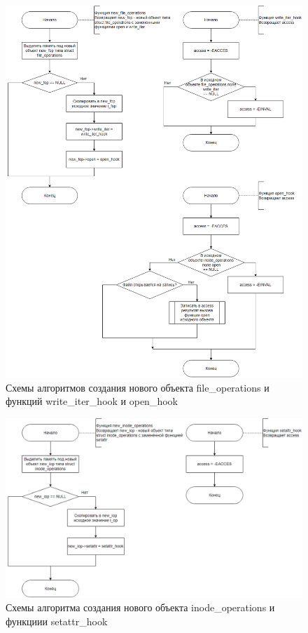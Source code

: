 \begin{figure}[h]
	\centering
	\captionsetup{justification=centering}
	\includegraphics[width=170mm]{img/new_file_operations.png}
	\caption{Схемы алгоритмов создания нового объекта file\_operations и функций write\_iter\_hook и open\_hook}
	\label{fig:new-file-operations}
\end{figure}

\begin{figure}[h]
	\centering
	\captionsetup{justification=centering}
	\includegraphics[width=170mm]{img/new_inode_operations.png}
	\caption{Схемы алгоритма создания нового объекта inode\_operations и функциии setattr\_hook}
	\label{fig:new-inode-operations}
\end{figure}

